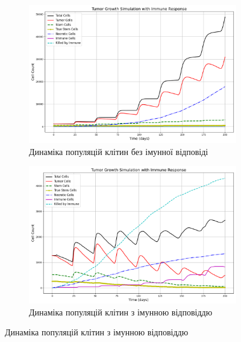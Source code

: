 \documentclass{article}
\begin{document}
\begin{figure}[H]
    \centering
    \begin{subfigure}[t]{0.75\linewidth}
        \centering
        \includegraphics[width=\linewidth]{tumor_simulation_stats/tumor_stats.png}
        \caption{Динаміка популяцій клітин без імунної відповіді}
        \label{fig:tumor-stats-no-immune}
    \end{subfigure}

    \begin{subfigure}[t]{0.75\linewidth}
        \centering
        \includegraphics[width=\linewidth]{tumor_immune_simulation_stats/tumor_immune_stats.png}
        \caption{Динаміка популяцій клітин з імунною відповіддю}
        \label{fig:tumor-stats-immune}
    \end{subfigure}
    \label{fig:stats-comparison}
\end{figure}
\end{document}

